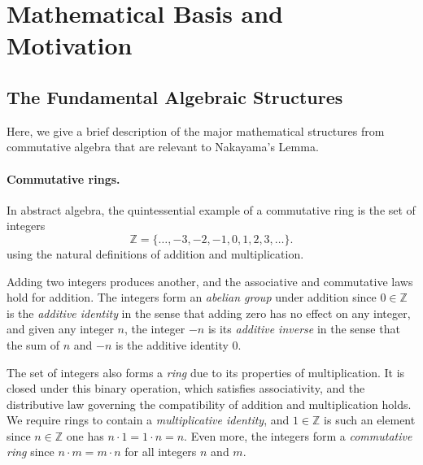 \documentclass{article}
\begin{document}

\section{Mathematical Basis and Motivation}
\subsection{The Fundamental Algebraic Structures}
Here, we give a brief description of the major mathematical structures from
commutative algebra that are relevant to Nakayama's Lemma.

\paragraph{Commutative rings.}
In abstract algebra, the quintessential example of a commutative ring is the
set of integers
\[\mathbb{Z} = \{ \ldots, -3, -2, -1, 0, 1, 2, 3, \ldots \}.\]
using the natural definitions of addition and multiplication.

Adding two integers produces another, and the associative and commutative laws
hold for addition. The integers form an \emph{abelian group} under addition
since $0 \in \mathbb{Z}$ is the \emph{additive identity} in the sense that
adding zero has no effect on any integer, and given any integer $n$, the
integer $-n$ is its \emph{additive inverse} in the sense that the sum of $n$
and $-n$ is the additive identity $0$. 

The set of integers also forms a \emph{ring} due to its properties of
multiplication. It is closed under this binary operation, which satisfies
associativity, and the distributive law governing the compatibility of addition
and multiplication holds.  We require rings to contain a \emph{multiplicative
identity}, and $1 \in \mathbb{Z}$ is such an element since $n \in \mathbb{Z}$
one has $n \cdot 1 = 1 \cdot n = n$. Even more, the integers form a
\emph{commutative ring} since $n \cdot m = m \cdot n$ for all integers $n$ and
$m$. 
\end{document}

